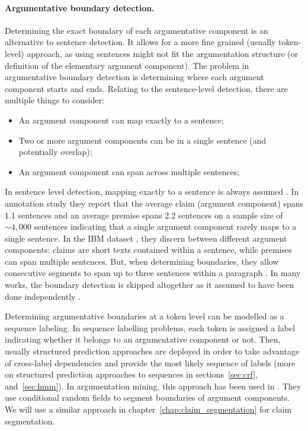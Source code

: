 \paragraph{Argumentative boundary detection.} Determining the exact boundary of
each argumentative component is an alternative to sentence detection. It allows
for a more fine grained (usually token-level) approach, as using sentences
might not fit the argumentation structure (or definition of the elementary
argument component).  The problem in argumentative boundary detection is
determining where each argument component starts and ends.
Relating to the sentence-level detection, there are 
multiple things to consider:
\begin{itemize}
\item An argument component can map exactly to a sentence;
\item Two or more argument components can be in a single sentence (and potentially overlap);
\item An argument component can span across multiple sentences;
\end{itemize}
In sentence level detection, mapping exactly to a sentence is always assumed
\citep{palau2009argumentation, levy2014context}. 
In \citet{habernal2014argumentation} annotation study they report
that the average claim (argument component) spans 1.1 sentences and an average
premise spans 2.2 sentences on a sample size of ${\sim}4,000$ sentences 
indicating that a single argument component 
rarely maps to a single sentence. In the IBM dataset \citep{levy2014context},
they discern between different argument components: claims are short texts
contained within a sentence, while premises can span multiple sentences. But, when
determining boundaries, they allow consecutive segments to span up to three
sentences within a paragraph \citep{rinott2015show}.
In many works, the boundary detection is skipped altogether as it assumed to have
been done independently \citep{stab2014identifying, eckle2015role}. 

Determining argumentative boundaries at a token level can be modelled as a
sequence labeling. In sequence labelling problems, each token is assigned a
label indicating whether it belongs to an argumentative component or not.
Then, usually structured prediction approaches are deployed in order to take
advantage of cross-label
dependencies and provide the most likely sequence of labels
(more on structured prediction approaches to sequences
in sections~\ref{sec:crf}, and~\ref{sec:hmm}).  In argumentation mining, this
approach has been used in \citep{goudas2014argument, sardianos2015argument,
park2015conditional}.  They use conditional random fields to segment boundaries
of argument components.  We will use a similar approach in
chapter~\ref{chap:claim_segmentation} for claim segmentation. 

